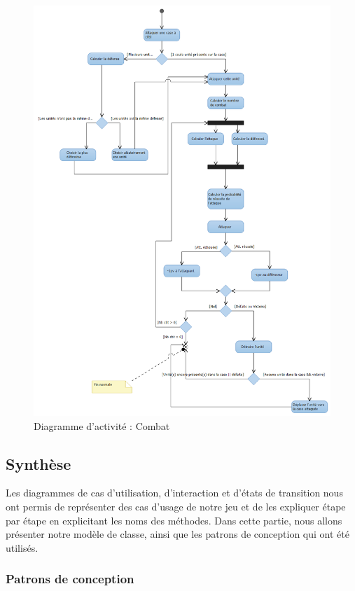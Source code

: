 \documentclass[a4paper,11pt]{article}
\begin{document}
\begin{figure}[H]
	\centering
	\includegraphics[width=\textwidth]{fig/diagramme_activite_combatUnite}
	\caption{Diagramme d'activité : Combat}
	\label{da:cbt}
\end{figure}

\subsection{Synthèse}
Les diagrammes de cas d'utilisation, d'interaction et d'états de transition nous ont permis de représenter des cas d'usage de notre jeu et de les expliquer étape par étape en explicitant les noms des méthodes. Dans cette partie, nous allons présenter notre modèle de classe, ainsi que les patrons de conception qui ont été utilisés.
\subsubsection{Patrons de conception}
\end{document}
